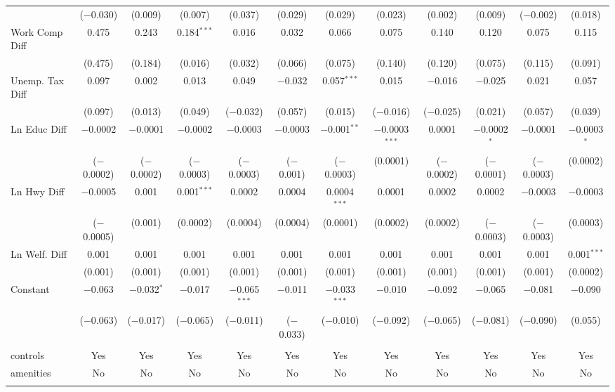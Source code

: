 \begin{table}[!htbp]
\begin{tabular}{@{\extracolsep{5pt}}lccccccccccc}
  & ($-$0.030) & (0.009) & (0.007) & (0.037) & (0.029) & (0.029) & (0.023) & (0.002) & (0.009) & ($-$0.002) & (0.018) \\ 
  Work Comp Diff & 0.475 & 0.243 & 0.184$^{***}$ & 0.016 & 0.032 & 0.066 & 0.075 & 0.140 & 0.120 & 0.075 & 0.115 \\ 
  & (0.475) & (0.184) & (0.016) & (0.032) & (0.066) & (0.075) & (0.140) & (0.120) & (0.075) & (0.115) & (0.091) \\ 
  Unemp. Tax Diff & 0.097 & 0.002 & 0.013 & 0.049 & $-$0.032 & 0.057$^{***}$ & 0.015 & $-$0.016 & $-$0.025 & 0.021 & 0.057 \\ 
  & (0.097) & (0.013) & (0.049) & ($-$0.032) & (0.057) & (0.015) & ($-$0.016) & ($-$0.025) & (0.021) & (0.057) & (0.039) \\ 
  Ln Educ Diff & $-$0.0002 & $-$0.0001 & $-$0.0002 & $-$0.0003 & $-$0.0003 & $-$0.001$^{**}$ & $-$0.0003$^{***}$ & 0.0001 & $-$0.0002$^{*}$ & $-$0.0001 & $-$0.0003$^{*}$ \\ 
  & ($-$0.0002) & ($-$0.0002) & ($-$0.0003) & ($-$0.0003) & ($-$0.001) & ($-$0.0003) & (0.0001) & ($-$0.0002) & ($-$0.0001) & ($-$0.0003) & (0.0002) \\ 
  Ln Hwy Diff & $-$0.0005 & 0.001 & 0.001$^{***}$ & 0.0002 & 0.0004 & 0.0004$^{***}$ & 0.0001 & 0.0002 & 0.0002 & $-$0.0003 & $-$0.0003 \\ 
  & ($-$0.0005) & (0.001) & (0.0002) & (0.0004) & (0.0004) & (0.0001) & (0.0002) & (0.0002) & ($-$0.0003) & ($-$0.0003) & (0.0003) \\ 
  Ln Welf. Diff & 0.001 & 0.001 & 0.001 & 0.001 & 0.001 & 0.001 & 0.001 & 0.001 & 0.001 & 0.001 & 0.001$^{***}$ \\ 
  & (0.001) & (0.001) & (0.001) & (0.001) & (0.001) & (0.001) & (0.001) & (0.001) & (0.001) & (0.001) & (0.0002) \\ 
  Constant & $-$0.063 & $-$0.032$^{*}$ & $-$0.017 & $-$0.065$^{***}$ & $-$0.011 & $-$0.033$^{***}$ & $-$0.010 & $-$0.092 & $-$0.065 & $-$0.081 & $-$0.090 \\ 
  & ($-$0.063) & ($-$0.017) & ($-$0.065) & ($-$0.011) & ($-$0.033) & ($-$0.010) & ($-$0.092) & ($-$0.065) & ($-$0.081) & ($-$0.090) & (0.055) \\ 
 \hline \\[-1.8ex] 
controls & Yes & Yes & Yes & Yes & Yes & Yes & Yes & Yes & Yes & Yes & Yes \\ 
amenities & No & No & No & No & No & No & No & No & No & No & No \\ 
\hline \\[-1.8ex] 

\end{tabular}
\end{table}
